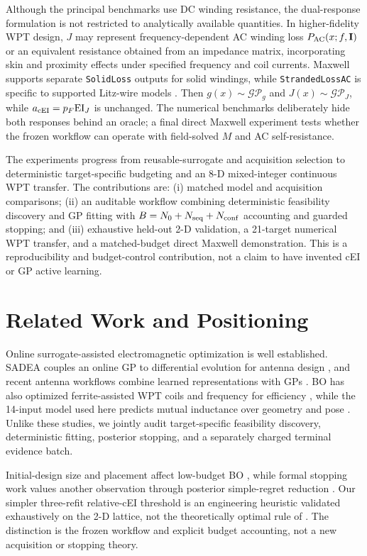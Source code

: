 \documentclass[conference]{IEEEtran}
\begin{document}
Although the principal benchmarks use DC winding resistance, the dual-response formulation is not restricted to analytically available quantities. In higher-fidelity WPT design, $J$ may represent frequency-dependent AC winding loss $P_{\rm AC}(x;f,\mathbf I)$ or an equivalent resistance obtained from an impedance matrix, incorporating skin and proximity effects under specified frequency and coil currents. Maxwell supports separate \texttt{SolidLoss} outputs for solid windings, while \texttt{StrandedLossAC} is specific to supported Litz-wire models \cite{ansysloss}. Then $g(x)\sim\mathcal{GP}_g$ and $J(x)\sim\mathcal{GP}_J$, while $a_{\rm cEI}=p_F\mathrm{EI}_J$ is unchanged. The numerical benchmarks deliberately hide both responses behind an oracle; a final direct Maxwell experiment tests whether the frozen workflow can operate with field-solved $M$ and AC self-resistance.

The experiments progress from reusable-surrogate and acquisition selection to deterministic target-specific budgeting and an 8-D mixed-integer continuous WPT transfer. The contributions are: (i) matched model and acquisition comparisons; (ii) an auditable workflow combining deterministic feasibility discovery and GP fitting with $B=N_0+N_{\rm seq}+N_{\rm conf}$ accounting and guarded stopping; and (iii) exhaustive held-out 2-D validation, a 21-target numerical WPT transfer, and a matched-budget direct Maxwell demonstration. This is a reproducibility and budget-control contribution, not a claim to have invented cEI or GP active learning.

\section{Related Work and Positioning}
Online surrogate-assisted electromagnetic optimization is well established. SADEA couples an online GP to differential evolution for antenna design \cite{liu2014}, and recent antenna workflows combine learned representations with GPs \cite{wu2024}. BO has also optimized ferrite-assisted WPT coils and frequency for efficiency \cite{sim2023}, while the 14-input model used here predicts mutual inductance over geometry and pose \cite{asadi2025}. Unlike these studies, we jointly audit target-specific feasibility discovery, deterministic fitting, posterior stopping, and a separately charged terminal evidence batch.

Initial-design size and placement affect low-budget BO \cite{furuuchi2024}, while formal stopping work values another observation through posterior simple-regret reduction \cite{ishibashi2023}. Our simpler three-refit relative-cEI threshold is an engineering heuristic validated exhaustively on the 2-D lattice, not the theoretically optimal rule of \cite{ishibashi2023}. The distinction is the frozen workflow and explicit budget accounting, not a new acquisition or stopping theory.
\end{document}
